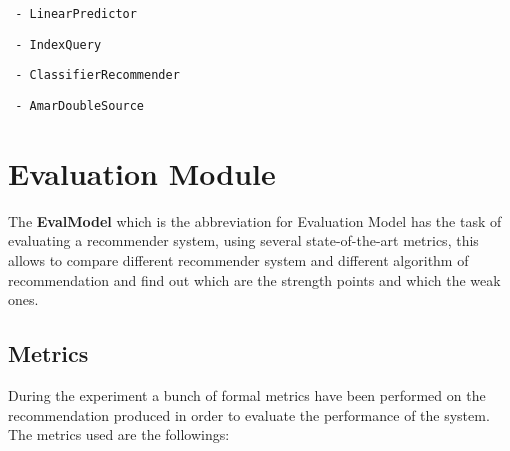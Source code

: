 \documentclass[11pt]{article}
\begin{document}
    \lstinline[style=verbatim-text]| - LinearPredictor |  \\
\hfill\break
\hfill\break


    \lstinline[style=verbatim-text]| - IndexQuery |  \\
\hfill\break
\hfill\break


    \lstinline[style=verbatim-text]| - ClassifierRecommender |  \\
\hfill\break
\hfill\break


    \lstinline[style=verbatim-text]| - AmarDoubleSource |  \\
\hfill\break
\hfill\break



\section{Evaluation Module}\label{sec:eva-module}
The \textbf{EvalModel} which is the abbreviation for Evaluation Model has the task of evaluating a recommender system,
using several state-of-the-art metrics, this allows to compare different recommender system and different algorithm of
recommendation and find out which are the strength points and which the weak ones.

\subsection{Metrics}\label{subsec:metrics}
During the experiment a bunch of formal metrics have been performed on the recommendation produced in order to evaluate
the performance of the system.
The metrics used are the followings:
\hfill\break
\end{document}
